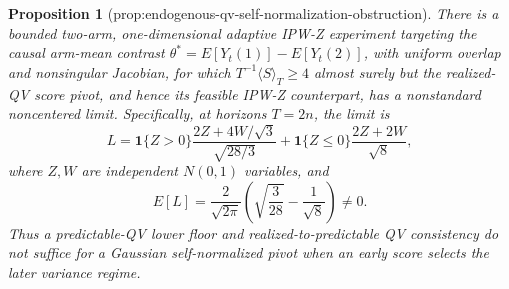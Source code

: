 \documentclass{article}
\newtheorem{proposition}{Proposition}
\begin{document}
\begin{proposition}[prop:endogenous-qv-self-normalization-obstruction]\label{prop:endogenous-qv-self-normalization-obstruction}
There is a bounded two-arm, one-dimensional adaptive IPW-Z experiment targeting the causal arm-mean contrast \(\theta^*=E[Y_t(1)]-E[Y_t(2)]\), with uniform overlap and nonsingular Jacobian, for which \(T^{-1}\langle S\rangle_T\ge4\) almost surely but the realized-QV score pivot, and hence its feasible IPW-Z counterpart, has a nonstandard noncentered limit. Specifically, at horizons \(T=2n\), the limit is
\[
 L=\mathbf1\{Z>0\}\frac{2Z+4W/\sqrt3}{\sqrt{28/3}}
 +\mathbf1\{Z\le0\}\frac{2Z+2W}{\sqrt8},
\]
where \(Z,W\) are independent \(N(0,1)\) variables, and
\[
 E[L]=\frac{2}{\sqrt{2\pi}}
 \left(\sqrt{\frac3{28}}-\frac1{\sqrt8}\right)\ne0.
\]
Thus a predictable-QV lower floor and realized-to-predictable QV consistency do not suffice for a Gaussian self-normalized pivot when an early score selects the later variance regime.
\end{proposition}
\end{document}

